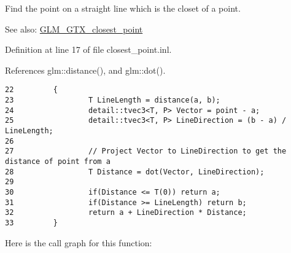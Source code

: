 Find the point on a straight line which is the closet of a point. \begin{Desc}
\item[See also:]\hyperlink{group__gtx__closest__point}{GLM\_\-GTX\_\-closest\_\-point} \end{Desc}


Definition at line 17 of file closest\_\-point.inl.

References glm::distance(), and glm::dot().

\begin{Code}\begin{verbatim}22         {
23                 T LineLength = distance(a, b);
24                 detail::tvec3<T, P> Vector = point - a;
25                 detail::tvec3<T, P> LineDirection = (b - a) / LineLength;
26 
27                 // Project Vector to LineDirection to get the distance of point from a
28                 T Distance = dot(Vector, LineDirection);
29 
30                 if(Distance <= T(0)) return a;
31                 if(Distance >= LineLength) return b;
32                 return a + LineDirection * Distance;
33         }
\end{verbatim}
\end{Code}




Here is the call graph for this function: